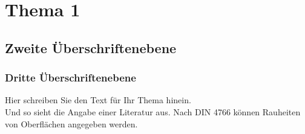 \chapter{Thema 1}
\section{Zweite Überschriftenebene}
\subsection{Dritte Überschriftenebene}
Hier schreiben Sie den Text für Ihr Thema hinein.\\
Und so sieht die Angabe einer Literatur aus. Nach DIN 4766 \cite{DIN4766.03.1981} können Rauheiten von Oberflächen angegeben werden.